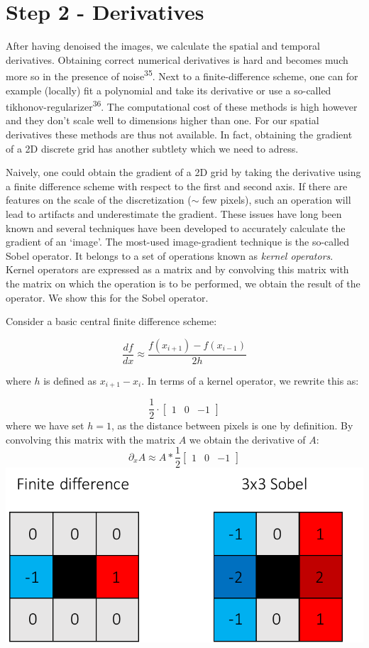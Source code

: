 \documentclass[12pt,a4paper,]{Dissertate}
\begin{document}
\hypertarget{step-2---derivatives}{%
\section{Step 2 - Derivatives}\label{step-2---derivatives}}

After having denoised the images, we calculate the spatial and temporal
derivatives. Obtaining correct numerical derivatives is hard and becomes
much more so in the presence of noise\textsuperscript{35}. Next to a
finite-difference scheme, one can for example (locally) fit a polynomial
and take its derivative or use a so-called
tikhonov-regularizer\textsuperscript{36}. The computational cost of
these methods is high however and they don't scale well to dimensions
higher than one. For our spatial derivatives these methods are thus not
available. In fact, obtaining the gradient of a 2D discrete grid has
another subtlety which we need to adress.

Naively, one could obtain the gradient of a 2D grid by taking the
derivative using a finite difference scheme with respect to the first
and second axis. If there are features on the scale of the
discretization (\(\sim\) few pixels), such an operation will lead to
artifacts and underestimate the gradient. These issues have long been
known and several techniques have been developed to accurately calculate
the gradient of an `image'. The most-used image-gradient technique is
the so-called Sobel operator. It belongs to a set of operations known as
\emph{kernel operators}. Kernel operators are expressed as a matrix and
by convolving this matrix with the matrix on which the operation is to
be performed, we obtain the result of the operator. We show this for the
Sobel operator.

Consider a basic central finite difference scheme:

\[
\frac{df}{dx}\approx\frac{f(x_{i+1})-f(x_{i-1})}{2h}
\]

where \(h\) is defined as \(x_{i+1}-x_{i}\). In terms of a kernel
operator, we rewrite this as:

\[\frac{1}{2}\cdot
\begin{bmatrix}
1 & 0 & -1
\end{bmatrix}
\] where we have set \(h=1\), as the distance between pixels is one by
definition. By convolving this matrix with the matrix \(A\) we obtain
the derivative of \(A\): \[
\partial_xA\approx A*\frac{1}{2}\begin{bmatrix}
1 & 0 & -1
\end{bmatrix}
\] \includegraphics{source/figures/pdf/derivative.pdf}
\end{document}
